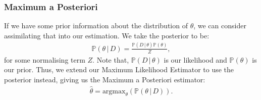 \subsubsection{Maximum a Posteriori}

If we have some prior information about the distribution of
$\theta$, we can consider assimilating that into our estimation.
We take the posterior to be: \begin{gather*}
    \mathbb{P}(\theta \, | \, D) 
    = \frac{
        \mathbb{P}(D \, | \, \theta)\mathbb{P}(\theta)
        }{Z},
\end{gather*} for some normalising term $Z$. Note that,
$\mathbb{P}(D \, | \, \theta)$ is our likelihood and 
$\mathbb{P}(\theta)$ is our prior. Thus, we extend
our Maximum Likelihood Estimator to use the posterior instead,
giving us the Maximum a Posteriori estimator: \begin{gather*}
    \hat\theta = \text{argmax}_\theta(\mathbb{P}(\theta \, | \, D)).
\end{gather*}